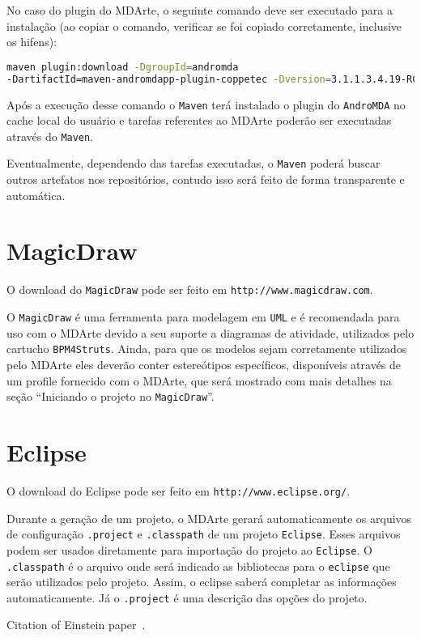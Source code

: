 No caso do plugin do MDArte, o seguinte comando deve ser executado para a
instalação (ao copiar o comando, verificar se foi copiado corretamente,
inclusive os hifens):

\begin{lstlisting}[language=bash]
maven plugin:download -DgroupId=andromda
-DartifactId=maven-andromdapp-plugin-coppetec -Dversion=3.1.1.3.4.19-RC8
\end{lstlisting}
	
Após a execução desse comando o \texttt{Maven} terá instalado o plugin do
\texttt{AndroMDA} no cache local do usuário e tarefas referentes ao MDArte
poderão ser executadas através do \texttt{Maven}.

Eventualmente, dependendo das tarefas executadas, o \texttt{Maven} poderá buscar
outros artefatos nos repositórios, contudo isso será feito de forma transparente
e automática.

\section{MagicDraw}

O download do \texttt{MagicDraw} pode ser feito em
\texttt{http://www.magicdraw.com}.

O \texttt{MagicDraw} é uma ferramenta para modelagem em \texttt{UML} e é
recomendada para uso com o MDArte devido a seu suporte a diagramas de atividade,
utilizados pelo cartucho \texttt{BPM4Struts}. Ainda, para que os modelos sejam
corretamente utilizados pelo MDArte eles deverão conter estereótipos
específicos, disponíveis através de um profile fornecido com o MDArte, que será
mostrado com mais detalhes na seção “Iniciando o projeto no \texttt{MagicDraw}”.

\section{Eclipse}

O download do Eclipse pode ser feito em \texttt{http://www.eclipse.org/}. 

Durante a geração de um projeto, o MDArte gerará automaticamente os arquivos de
configuração \texttt{.project} e \texttt{.classpath} de um projeto
\texttt{Eclipse}. Esses arquivos podem ser usados diretamente para importação do
projeto ao \texttt{Eclipse}. O \texttt{.classpath} é o arquivo onde será
indicado as bibliotecas para o \texttt{eclipse} que serão utilizados pelo
projeto. Assim, o eclipse saberá completar as informações automaticamente. Já o
\texttt{.project} é uma descrição das opções do projeto.

Citation of Einstein paper~\cite{Einstein}.
